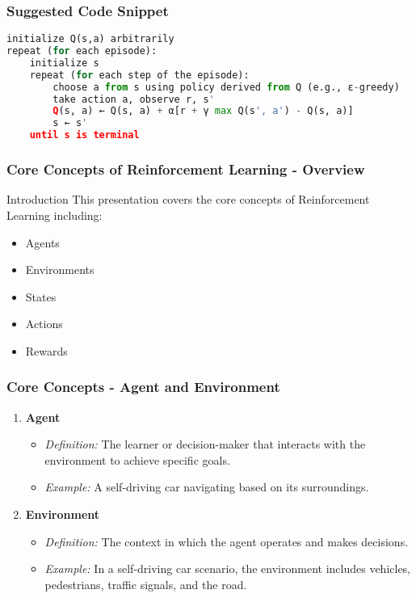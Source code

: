 \documentclass[aspectratio=169]{beamer}
\begin{document}
\begin{frame}[fragile]
    \frametitle{Suggested Code Snippet}
    \begin{lstlisting}[language=Python]
initialize Q(s,a) arbitrarily
repeat (for each episode):
    initialize s
    repeat (for each step of the episode):
        choose a from s using policy derived from Q (e.g., ε-greedy)
        take action a, observe r, s'
        Q(s, a) ← Q(s, a) + α[r + γ max Q(s', a') - Q(s, a)]
        s ← s'
    until s is terminal
    \end{lstlisting}
\end{frame}

\begin{frame}[fragile]
    \frametitle{Core Concepts of Reinforcement Learning - Overview}
    \begin{block}{Introduction}
        This presentation covers the core concepts of Reinforcement Learning including:
        \begin{itemize}
            \item Agents
            \item Environments
            \item States
            \item Actions
            \item Rewards
        \end{itemize}
    \end{block}
\end{frame}

\begin{frame}[fragile]
    \frametitle{Core Concepts - Agent and Environment}
    \begin{enumerate}
        \item \textbf{Agent}
        \begin{itemize}
            \item \textit{Definition:} The learner or decision-maker that interacts with the environment to achieve specific goals.
            \item \textit{Example:} A self-driving car navigating based on its surroundings.
        \end{itemize}
        
        \item \textbf{Environment}
        \begin{itemize}
            \item \textit{Definition:} The context in which the agent operates and makes decisions.
            \item \textit{Example:} In a self-driving car scenario, the environment includes vehicles, pedestrians, traffic signals, and the road.
        \end{itemize}
    \end{enumerate}
\end{frame}
\end{document}
